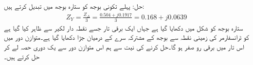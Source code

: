 حل:\quad
پہلے تکونی بوجھ کو ستارہ بوجھ میں تبدیل کرتے ہیں:
\begin{align*}
Z_Y= \frac{Z_\Delta}{3}=\frac{0.504+j0.1917}{3}=0.168+j0.0639
\end{align*}
ستارہ بوجھ کو شکل  میں دکھایا گیا ہے جہاں ایک برقی تار جسے نقطہ دار لکیر سے ظاہر کیا گیا ہے کو ٹرانسفارمر کی زمینی نقطہ سے بوجھ کے مشترکہ سرے کے درمیان جڑا دکھایا گیا ہے۔متوازن دور میں اس تار میں برقی رو صفر ہو گا۔حل کرنے کی نیت سے ہم اس متوازن دور سے یک دوری حصہ لے کر حل کرتے ہیں۔
\begin{figure}
\centering
\end{figure}
